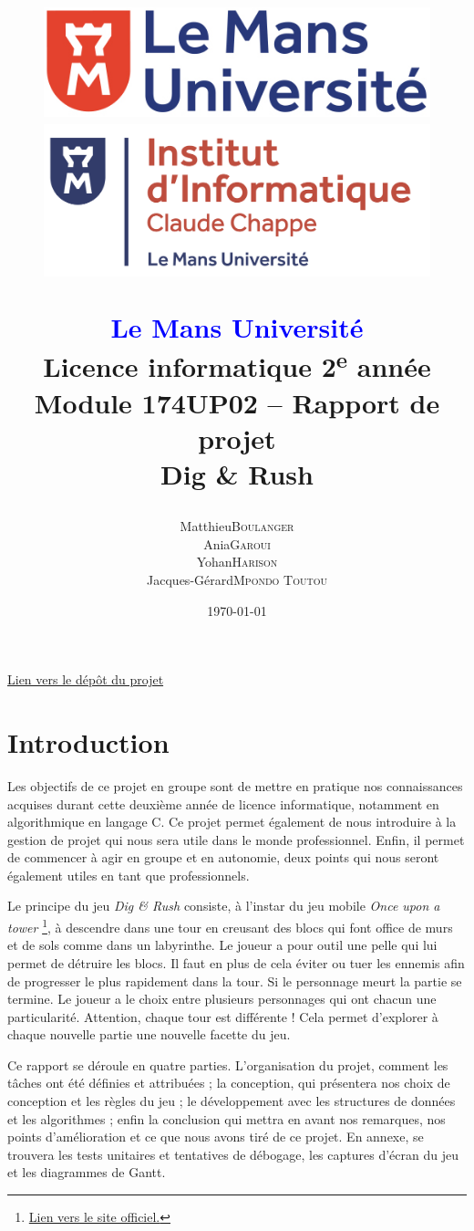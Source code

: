 \documentclass[a4paper,12pt]{article}
\title{
    \begin{figure}[!t]
	\begin{minipage}{.25\textwidth}
	    \includegraphics[width=\textwidth]{img/logo_lmu.png}
	\end{minipage}
	\hspace{.5\textwidth}
	\begin{minipage}{.25\textwidth}
	    \includegraphics[width=\textwidth]{img/logo_ic2.png}
	\end{minipage}
    \end{figure}
    \begin{center}
	\textbf{\textcolor{blue}{Le Mans Université}} \\
	Licence informatique 2\textsuperscript{e} année \\
	Module 174UP02 – Rapport de projet \\
	\textbf{Dig \& Rush}
    \end{center}
}
\author{
	\begin{tabular}{rl}
	    Matthieu & \textsc{Boulanger} \\
	    Ania & \textsc{Garoui} \\
	    Yohan & \textsc{Harison} \\
	    Jacques-Gérard & \textsc{Mpondo Toutou}
	\end{tabular}
}
\date{\today}
\begin{document}
\maketitle
\begin{center}
    \href{https://github.com/idlusen/dig-and-rush/}{Lien vers le dépôt du projet}
\end{center}
\newpage

\tableofcontents
\newpage


\section{Introduction}

Les objectifs de ce projet en groupe sont de mettre en pratique nos connaissances acquises durant cette deuxième année de licence informatique, notamment en algorithmique en langage C.
Ce projet permet également de nous introduire à la gestion de projet qui nous sera utile dans le monde professionnel. 
Enfin, il permet de commencer à agir en groupe et en autonomie, deux points qui nous seront également utiles en tant que professionnels.

Le principe du jeu \textit{Dig \& Rush} consiste, à l’instar du jeu mobile \textit{Once upon a tower} \footnote{\href{https://www.pomelogames.com/once-upon-a-tower}{Lien vers le site officiel.}}, à descendre dans une tour en creusant des blocs qui font office de murs et de sols comme dans un labyrinthe. 
Le joueur a pour outil une pelle qui lui permet de détruire les blocs. 
Il faut en plus de cela éviter ou tuer les ennemis afin de progresser le plus rapidement dans la tour. 
Si le personnage meurt la partie se termine. Le joueur a le choix entre plusieurs personnages qui ont chacun une particularité.
Attention, chaque tour est différente ! Cela permet d’explorer à chaque nouvelle partie une nouvelle facette du jeu.

Ce rapport se déroule en quatre parties. 
L’organisation du projet, comment les tâches ont été définies et attribuées ; la conception, qui présentera nos choix de conception et les règles du jeu ; le développement avec les structures de données et les algorithmes ; enfin la conclusion qui mettra en avant nos remarques, nos points d’amélioration et ce que nous avons tiré de ce projet. 
En annexe, se trouvera les tests unitaires et tentatives de débogage, les captures d’écran du jeu et les diagrammes de Gantt.
\end{document}
